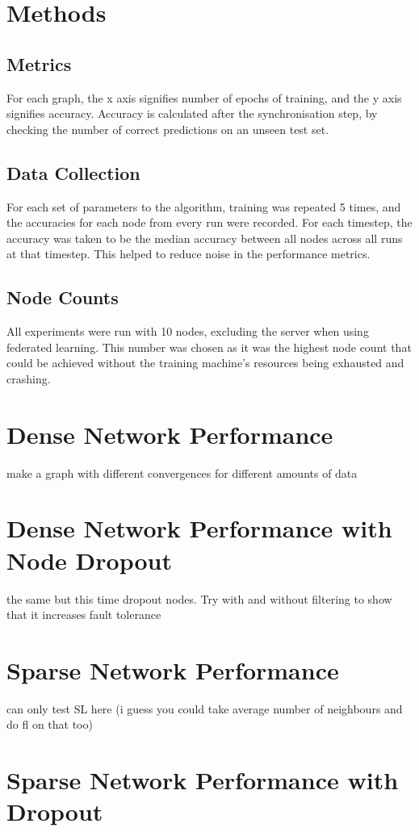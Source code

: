 \section{Methods}
\subsection{Metrics}
For each graph, the x axis signifies number of epochs of training, and the y axis signifies accuracy. Accuracy is calculated after the synchronisation step, by checking the number of correct predictions on an unseen test set.

\subsection{Data Collection}
For each set of parameters to the algorithm, training was repeated 5 times, and the accuracies for each node from every run were recorded. For each timestep, the accuracy was taken to be the median accuracy between all nodes across all runs at that timestep. This helped to reduce noise in the performance metrics.

\subsection{Node Counts}
All experiments were run with 10 nodes, excluding the server when using federated learning. This number was chosen as it was the highest node count that could be achieved without the training machine's resources being exhausted and crashing.

\section{Dense Network Performance}

make a graph with different convergences for different amounts of data

\section{Dense Network Performance with Node Dropout}

the same but this time dropout nodes. Try with and without filtering to show that it increases fault tolerance

\section{Sparse Network Performance}

can only test SL here (i guess you could take average number of neighbours and do fl on that too)

\section{Sparse Network Performance with Dropout}